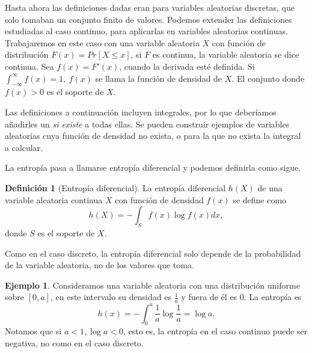 \documentclass[10pt,a4paper]{article} %
\theoremstyle{definition}
\newtheorem{definition}{Definición}[section]
\newtheorem{example}[theorem]{Ejemplo}
\begin{document}
Hasta ahora las definiciones dadas eran para variables aleatorias discretas, que solo tomaban un conjunto finito de valores. Podemos extender las definiciones estudiadas al caso continuo, para aplicarlas en variables aleatorias continuas. Trabajaremos en este caso con una variable aleatoria $X$ con función de distribución $F(x) = Pr[X \leq x]$, si $F$ es continua, la variable aleatoria se dice continua. Sea $f(x) = F'(x)$, cuando la derivada esté definida. Si $\int_{-\infty}^{\infty}f(x)=1,\ f(x)$ se llama la función de densidad de $X$. El conjunto donde $f(x) > 0$ es el soporte de $X$.

Las definiciones a continuación incluyen integrales, por lo que deberíamos añadirles un \textit{si existe} a todas ellas. Se pueden construir ejemplos de variables aleatorias cuya función de densidad no exista, o para la que no exista la integral a calcular.

La entropía pasa a llamarse entropía diferencial y podemos definirla como sigue.

\begin{definition}[Entropía diferencial]
  La entropía diferencial $h(X)$ de una variable aleatoria continua $X$ con función de densidad $f(x)$ se define como\[
h(X) = - \int_Sf(x)\log f(x)dx,
\]
donde $S$ es el soporte de $X$.
\end{definition}
Como en el caso discreto, la entropía diferencial solo depende de la probabilidad de la variable aleatoria, no de los valores que toma. 

\begin{example}\label{ej:uni} Consideramos una variable aleatoria con una distribución uniforme sobre $[0,a]$, en este intervalo su densidad es $\frac{1}{a}$ y fuera de él es 0. La entropía es \[
h(x) = - \int_0^a\frac{1}{a}\log\frac{1}{a} = \log a.
  \]
Notamos que si $a<1, \log a < 0$, esto es, la entropía en el caso continuo puede ser negativa, no como en el caso discreto.
\end{example}
\end{document}
